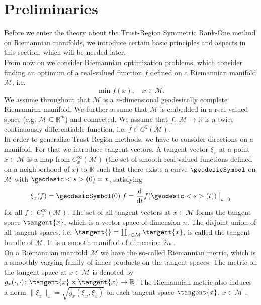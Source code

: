 \section{Preliminaries}

Before we enter the theory about the Trust-Region Symmetric Rank-One method on Riemannian manifolds, we introduce certain basic principles and aspects in this section, which will be needed later. \\

From now on we consider Riemannian optimization problems, which consider finding an optimum of a real-valued function $f$ defined on a Riemannian manifold $\mathcal{M}$, i.e.
\begin{equation*}
    \min f(x), \quad x \in \mathcal{M}.
\end{equation*}
We assume throughout that $\mathcal{M}$ is a $n$-dimensional geodesically complete Riemannian manifold. We further assume that $\mathcal{M}$ is embedded in a real-valued space (e.g. $\mathcal{M} \subseteq \mathbb{R}^m$) and connected. We assume that $f \colon \; \mathcal{M} \to \mathbb{R}$ is a twice continuously differentiable function, i.e. $f \in C^2(\mathcal{M})$. \\
In order to generalize Trust-Region methods, we have to consider directions on a manifold. For that we introduce tangent vectors. A tangent vector $\xi_x$ at a point $x \in \mathcal{M}$ is a map from $C^{\infty}_x(\mathcal{M})$ (the set of smooth real-valued functions defined on a neighborhood of $x$) to $\mathbb{R}$ such that there exists a curve $\geodesicSymbol$ on $\mathcal{M}$ with $\geodesic<s>(0) = x$, satisfying
\begin{equation*}
    \xi_x (f) = \dot{\geodesicSymbol}(0) \; f = \frac{\mathrm{d}}{\mathrm{d}t} f(\geodesic<s>(t)) \; \big{\vert}_{t=0}
\end{equation*}
for all $f \in C^{\infty}_x(\mathcal{M})$. The set of all tangent vectors at $x \in \mathcal{M}$ forms the tangent space $\tangent{x}$, which is a vector space of dimension $n$. The disjoint union of all tangent spaces, i.e. $\tangent{} = \coprod_{x \in \mathcal{M}} \tangent{x}$, is called the tangent bundle of $\mathcal{M}$. It is a smooth manifold of dimension $2n$ \cite[p.~33-36]{AbsilMahonySepulchre:2008}. \\
On a Riemannian manifold $\mathcal{M}$ we have the so-called Riemannian metric, which is a smoothly varying family of inner products on the tangent spaces. The metric on the tangent space at $x \in \mathcal{M}$ is denoted by $g_x(\cdot, \cdot) \colon \tangent{x} \times \tangent{x} \to \mathbb{R}$. The Riemannian metric also induces a norm $\lVert \xi_x \rVert_x = \sqrt{g_x(\xi_x, \xi_x)}$ on each tangent space $\tangent{x}$, $x \in \mathcal{M}$ \cite[p.~45]{AbsilMahonySepulchre:2008}. \\

